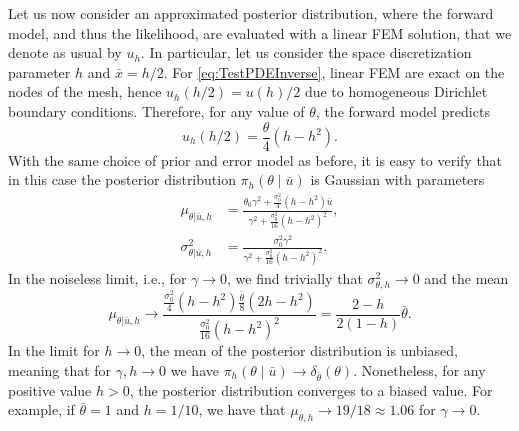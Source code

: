 \documentclass[10pt]{article}
\begin{document}
Let us now consider an approximated posterior distribution, where the forward model, and thus the likelihood, are evaluated with a linear FEM solution, that we denote as usual by $u_h$. In particular, let us consider the space discretization parameter $h$ and $\bar x = h / 2$. For \eqref{eq:TestPDEInverse}, linear FEM are exact on the nodes of the mesh, hence $u_h(h / 2) = u(h) / 2$ due to homogeneous Dirichlet boundary conditions. Therefore, for any value of $\theta$, the forward model predicts
\begin{equation}
	u_h(h / 2) = \frac{\theta}{4}(h - h^2).
\end{equation}
With the same choice of prior and error model as before, it is easy to verify that in this case the posterior distribution $\pi_h(\theta\mid\bar u)$ is Gaussian with parameters
\begin{equation}
\begin{aligned}
	\mu_{\theta|\bar u, h} &= \frac{\theta_0 \gamma^2 + \frac{\sigma_0^2}{4}(h - h^2)\bar u}{\gamma^2 + \frac{\sigma_0^2}{16}(h - h^2)^2}, \\
	\sigma^2_{\theta|\bar u, h} &= \frac{\sigma_0^2\gamma^2}{\gamma^2 + \frac{\sigma_0^2}{16}(h - h^2)^2}.
\end{aligned}
\end{equation}
In the noiseless limit, i.e., for $\gamma \to 0$, we find trivially that $\sigma_{\theta, h}^2 \to 0$ and the mean 
\begin{equation}
	\mu_{\theta|\bar u, h} \to \frac{\frac{\sigma_0^2}{4}(h - h^2)\frac{\bar \theta}{8}(2h - h^2)}{\frac{\sigma_0^2}{16}(h - h^2)^2} = \frac{2 - h}{2(1 - h)}\bar \theta.
\end{equation}
In the limit for $h \to 0$, the mean of the posterior distribution is unbiased, meaning that for $\gamma, h \to 0$ we have $\pi_h(\theta\mid \bar u) \to \delta_{\bar \theta}(\theta)$. Nonetheless, for any positive value $h > 0$, the posterior distribution converges to a biased value. For example, if $\bar \theta = 1$ and $h = 1 / 10$, we have that $\mu_{\theta, h} \to 19 / 18 \approx 1.06$ for $\gamma \to 0$.
\end{document}
